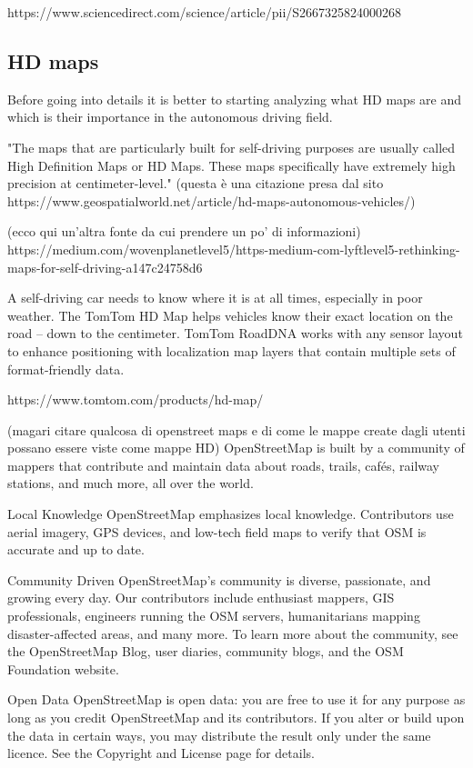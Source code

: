 https://www.sciencedirect.com/science/article/pii/S2667325824000268

\subsection{HD maps}
Before going into details it is better to starting analyzing what HD maps are and which is their importance in the autonomous driving field. 

"The maps that are particularly built for self-driving purposes are usually called High Definition Maps or HD Maps. These maps specifically have extremely high precision at centimeter-level." (questa è una citazione presa dal sito https://www.geospatialworld.net/article/hd-maps-autonomous-vehicles/)

(ecco qui un'altra fonte da cui prendere un po' di informazioni)
https://medium.com/wovenplanetlevel5/https-medium-com-lyftlevel5-rethinking-maps-for-self-driving-a147c24758d6

A self-driving car needs to know where it is at all times, especially in poor weather. The TomTom HD Map helps vehicles know their exact location on the road – down to the centimeter. TomTom RoadDNA works with any sensor layout to enhance positioning with localization map layers that contain multiple sets of format-friendly data.

https://www.tomtom.com/products/hd-map/

(magari citare qualcosa di openstreet maps e di come le mappe create dagli utenti possano essere viste come mappe HD)
OpenStreetMap is built by a community of mappers that contribute and maintain data about roads, trails, cafés, railway stations, and much more, all over the world.

Local Knowledge
OpenStreetMap emphasizes local knowledge. Contributors use aerial imagery, GPS devices, and low-tech field maps to verify that OSM is accurate and up to date.

Community Driven
OpenStreetMap's community is diverse, passionate, and growing every day. Our contributors include enthusiast mappers, GIS professionals, engineers running the OSM servers, humanitarians mapping disaster-affected areas, and many more. To learn more about the community, see the OpenStreetMap Blog, user diaries, community blogs, and the OSM Foundation website.

Open Data
OpenStreetMap is open data: you are free to use it for any purpose as long as you credit OpenStreetMap and its contributors. If you alter or build upon the data in certain ways, you may distribute the result only under the same licence. See the Copyright and License page for details.

